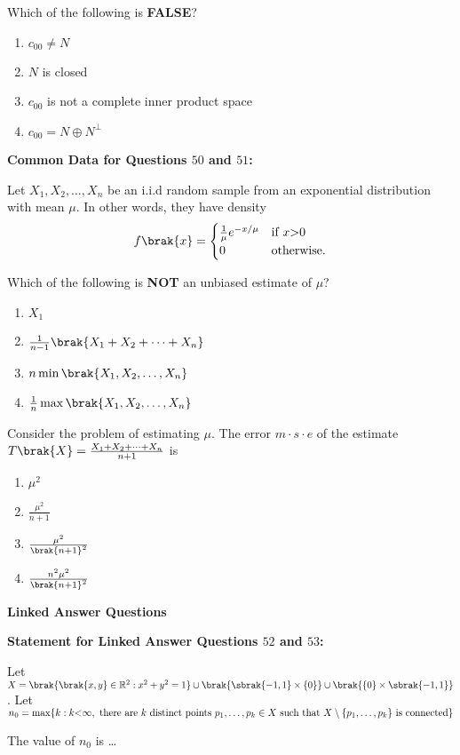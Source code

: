     \item Which of the following is \textbf{FALSE}?
    \begin{enumerate}
        \item $c_{00} \neq N$
        \item $N$ is closed
        \item $c_{00}$ is not a complete inner product space
        \item $c_{00} = N \oplus N^{\perp}$
    \end{enumerate}
\textbf{ Common Data for Questions $50$ and $51$:}

    Let $X_1, X_2, \dots, X_n$ be an i.i.d random sample from an exponential distribution with mean $\mu$. In other words, they have density
    \[
    f \brak{x} = 
    \begin{cases}
      \frac{1}{\mu} e^{-x / \mu} & \text{if } x \text{\textgreater} 0 \\
      0 & \text{otherwise}.
    \end{cases}
    \]

    \item Which of the following is \textbf{NOT} an unbiased estimate of $\mu$?
    \begin{enumerate}
        \item $X_1$
        \item $\frac{1}{n-1} \brak{X_1 + X_2 + \dots + X_n}$
        \item $n  \min \brak{X_1, X_2, \dots, X_n}$
        \item $\frac{1}{n}  \max \brak{X_1, X_2, \dots, X_n}$
    \end{enumerate}

    \item Consider the problem of estimating $\mu$. The  error $m \cdot s \cdot e$  of the estimate $T \brak{X} = \frac{X_1 + X_2 + \dots + X_n}{n + 1}$ is
    \begin{enumerate}
        \item $\mu^2$
        \item $\frac{\mu^2}{n + 1}$
        \item $\frac{ \mu^2}{\brak{n + 1}^2}$
        \item $\frac{n^2 \mu^2}{\brak{n + 1}^2}$
    \end{enumerate}

\textbf{ Linked Answer Questions}

   \textbf{ Statement for Linked Answer Questions $52$ and $53$:}

    Let $X = \brak{\brak{x, y} \in \mathbb{R}^2 : x^2 + y^2 = 1} \cup \brak{\sbrak{-1, 1} \times \{0\}} \cup \brak{\{0\} \times \sbrak{-1, 1}}$. Let $n_0 = \max \{k : k \text{\textless} \infty, \text{ there are } k \text{ distinct points } p_1, \dots, p_k \in X \text{ such that } X \setminus \{p_1, \dots, p_k\} \text{ is connected} \}$

    \item The value of $n_0$ is \dots









